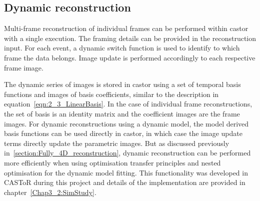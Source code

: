 \subsection{Dynamic reconstruction}
Multi-frame reconstruction of individual frames can be performed within \gls{castor} with a single execution. The framing details can be provided in the reconstruction input. For each event, a dynamic switch function is used to identify to which frame the data belongs. Image update is performed accordingly to each respective frame image.

The dynamic series of images is stored in \gls{castor} using a set of temporal basis functions and images of basis coefficients, similar to the description in equation~\ref{eqn:2_3_LinearBasis}. 
In the case of individual frame reconstructions, the set of basis is an identity matrix and the coefficient images are the frame images. 
For dynamic reconstructions using a dynamic model, the model derived basis functions can be used directly in \gls{castor}, in which case the image update terms directly update the parametric images.
But as discussed previously in~\autoref{section:Fully_4D_reconstruction}, dynamic reconstruction can be performed more efficiently when using optimisation transfer principles and nested optimisation for the dynamic model fitting. This functionality was developed in CASToR during this project and details of the implementation are provided in chapter~\ref{Chap3_2:SimStudy}.

